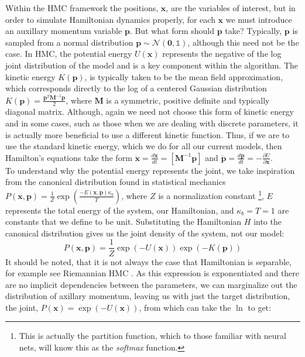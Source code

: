 \documentclass[twoside]{article}
\begin{document}
Within the HMC framework the positions, $\textbf{x}$, are the variables of interest, but in order to simulate Hamiltonian dynamics properly, for each $\textbf{x}$ we must introduce an auxillary momentum variable $\textbf{p}$. But what form should $\textbf{p}$ take? Typically, $\textbf{p}$ is sampled from a normal distribution $\textbf{p} \sim \mathcal{N}(\textbf{0}, \mathds{1})$, although this need not be the case. In HMC, the potential energy $U(\textbf{x})$ represents the negative of the log joint distribution of the model and is a key component within the algorithm.  The kinetic energy $K(\textbf{p})$, is typically taken to be the mean field approximation, which corresponds directly to the log of a centered Gaussian distribution $K(\textbf{p}) = \frac{\textbf{p}^{T} \textbf{M}^{-1} \textbf{p}}{2}$, where $\textbf{M}$ is a symmetric, positive definite and typically diagonal matrix. Although, again we need not choose this form of kinetic energy and in some cases, such as those when we are dealing with discrete parameters, it is actually more beneficial to use a different kinetic function\citep{nishimura2017discontinuous}. Thus, if we are to use the standard kinetic energy, which we do for all our current models, then Hamilton's equations take the form $
\dot{\textbf{x}} = \frac{d\textbf{x}}{dt} = [\textbf{M}^{-1}\textbf{p}]$ and $ \dot{\textbf{p}} = \frac{d\textbf{p}}{dt} = -\frac{\partial U}{\partial \textbf{x}}$.\\
To understand why the potential energy represents the joint, we take inspiration from the canonical distribution found in statistical mechanics
$P(\textbf{x},\textbf{p}) = \frac{1}{Z}\exp\left(\frac{-E(\textbf{x},\textbf{p})\kappa_{b}}{T}\right)$,
where $Z$ is a normalization constant \footnote{This is actually the partition function, which to those familiar with neural nets, will know this as the \textit{softmax} function. }, $E$ represents the total energy of the system, our Hamiltonian, and $\kappa_{b} = T = 1$ are constants that we define to be unit. Substituting the Hamiltonian $H$ into the canonical distribution gives us the joint density of the system, not our model:
\begin{equation}
P(\textbf{x},\textbf{p}) = \frac{1}{Z}\exp(-U(\textbf{x}))\exp(-K(\textbf{p})) 
\end{equation}
It should be noted, that it is not always the case that Hamiltonian is separable, for example see Riemannian HMC \citep{girolami2011riemann}. As this expression is exponentiated and there are no implicit dependencies between the parameters, we can marginalize out the distribution of axillary momentum, leaving us with just the target distribution, the joint, $P(\textbf{x})  = \exp(-U(\textbf{x}))$, from which can take the $\ln$ to get:
\end{document}

